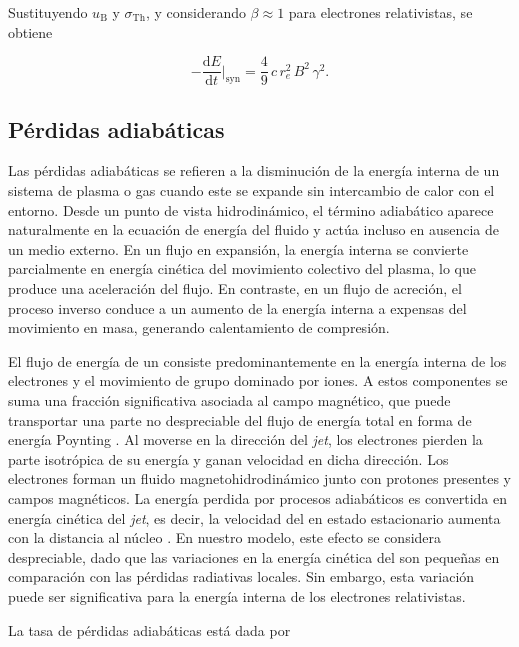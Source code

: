 Sustituyendo $u_{\mathrm{B}}$ y $\sigma_{\mathrm{Th}}$, y considerando $\beta \approx 1$ para electrones relativistas, se obtiene

\begin{equation}\label{eq:mod-2}
    -\frac{\mathrm{d}E}{\mathrm{d}t}\Bigg|_{\mathrm{syn}} = \frac{4}{9}\,c\,r_e^2\,B^2\,\gamma^2.
\end{equation}

\subsection{P\'erdidas adiab\'aticas}\label{ssec:perd-ad}

	Las pérdidas adiabáticas se refieren a la disminución de la energía interna de un sistema de plasma o gas cuando este se expande sin intercambio de calor con el entorno.
	Desde un punto de vista hidrodinámico, el término adiabático aparece naturalmente en la ecuación de energía del fluido y actúa incluso en ausencia de un medio externo.
	En un flujo en expansión, la energía interna se convierte parcialmente en energía cinética del movimiento colectivo del plasma, lo que produce una aceleración del flujo.
	En contraste, en un flujo de acreción, el proceso inverso conduce a un aumento de la energía interna a expensas del movimiento en masa, generando calentamiento de compresi\'on.

	El flujo de energía de un \jet consiste predominantemente en la energía interna de los electrones y el movimiento de grupo dominado por iones.
	A estos componentes se suma una fracción significativa asociada al campo magnético, que puede transportar una parte no despreciable del flujo de energía total en forma de energía Poynting \citep{Blandford1977, Meier2001}.
	Al moverse en la dirección del \textit{jet}, los electrones pierden la parte isotrópica de su energía y ganan velocidad en dicha dirección.
	Los electrones forman un fluido magnetohidrodinámico junto con protones presentes y campos magnéticos.
	La energía perdida por procesos adiabáticos es convertida en energía cinética del \textit{jet}, es decir, la velocidad del \jet en estado estacionario aumenta con la distancia al n\'ucleo \citep{Zdziarski2014}.
	En nuestro modelo, este efecto se considera despreciable, dado que las variaciones en la energía cinética del \jet son pequeñas en comparación con las pérdidas radiativas locales.
	Sin embargo, esta variación puede ser significativa para la energía interna de los electrones relativistas.

	La tasa de p\'erdidas adiab\'aticas está dada por


